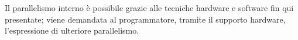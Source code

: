 \begin{figure}[ht]
    \centering
    \setlength{\fboxrule}{0.5pt} %
    \setlength{\fboxsep}{0pt}    %
\end{figure}

\noindent Il parallelismo interno è possibile grazie alle tecniche hardware e software fin qui presentate; viene demandata al programmatore, tramite il supporto hardware, l'espressione di ulteriore parallelismo.